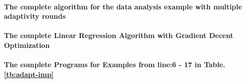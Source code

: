  \paragraph{The complete algorithm for the data analysis example with multiple adaptivity rounds} 
 
\paragraph{The complete Linear Regression Algorithm with Gradient Decent Optimization}

\paragraph*{The complete Programs for Examples from line:6 - 17 in Table.\ref{tb:adapt-imp}}
